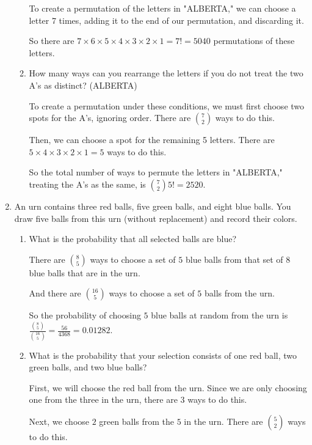 \documentclass{article}
\begin{document}
\begin{enumerate}
\begin{enumerate}[label= (\alph*)]
            To create a permutation of the letters in "ALBERTA," we can choose a 
            letter 7 times, adding it to the end of our permutation, and discarding it.

            So there are $7\times6\times5\times4\times3\times2\times1=7!=5040$ permutations of these
            letters.

        \item How many ways can you rearrange the letters if you do not treat the two A's as
        distinct? (ALBERTA)

        To create a permutation under these conditions, we must first choose
        two spots for the A's, ignoring order. There are $7\choose2$ ways to do this.

        Then, we can choose a spot for the remaining 5 letters. There are $5\times4
        \times3\times2\times1=5\!$ ways to do this.

        So the total number of ways to permute the letters in "ALBERTA," treating
        the A's as the same, is ${7\choose2} 5!=2520$.
        \end{enumerate}
        \newpage 
        \item An urn contains three red balls, five green balls, and eight blue balls. You draw five balls
        from this urn (without replacement) and record their colors.

        \begin{enumerate}[label= (\alph*)] 
            \item What is the probability that all selected balls are blue?
            
            There are $8\choose5$ ways to choose a set of $5$ blue balls from that set of $8$ blue balls that are in the urn.

            And there are $16\choose5$ ways to choose a set of $5$ balls from the urn.
            
            So the probability of choosing $5$ blue balls at random from the urn is $\frac{{8\choose5}}{{16\choose5}}=\frac{56}{4368}=0.01282$.

            \item What is the probability that your selection consists of one red ball, two green balls,
            and two blue balls?

            First, we will choose the red ball from the urn. Since we are only choosing one from the three in the urn, there are $3$ ways to do this.

            Next, we choose $2$ green balls from the $5$ in the urn. There are $5\choose2$ ways to do this.


\end{enumerate}
\end{enumerate}
\end{document}
